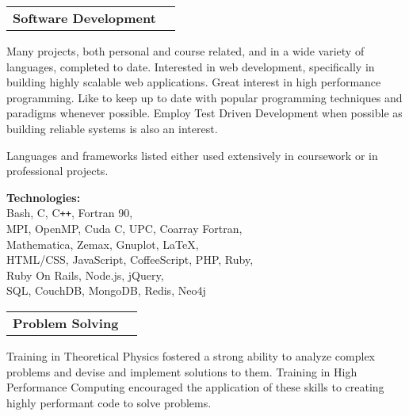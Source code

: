 \documentclass[11pt]{article}
\makeatletter
\newenvironment{resumeSubSectionHeader}{
    \par
    \begin{tabular*}{\textwidth}{l@{\extracolsep{\fill}}r}
    \par
} {
    \end{tabular*}
    \par
}
\newenvironment{resumeSubSectionBody}{
    \par
    \vspace{-0.8\parskip}
    \begin{small}
    \par
} {
    \par
    \end{small}
    \par
}
\makeatother
\begin{document}
%
%
\begin{resumeSubSectionHeader}

    \textbf{Software Development}

\end{resumeSubSectionHeader}
\begin{resumeSubSectionBody}

    Many projects, both personal and course related, and in a wide variety
    of languages, completed to date.
    Interested in web development, specifically in building highly
    scalable web applications.
    Great interest in high performance programming.
    Like to keep up to date with popular programming techniques and paradigms
    whenever possible.
    Employ Test Driven Development when possible as building reliable systems
    is also an interest.

    Languages and frameworks listed either used extensively in coursework
    or in professional projects.

    \begin{description}
        \item{\bf Technologies:} \\
            Bash, C, C\verb!++!, Fortran 90, \\
            MPI, OpenMP, Cuda C, UPC, Coarray Fortran, \\
            Mathematica, Zemax, Gnuplot, LaTeX, \\
            HTML/CSS, JavaScript, CoffeeScript, PHP, Ruby, \\
            Ruby On Rails, Node.js, jQuery, \\
            SQL, CouchDB, MongoDB, Redis, Neo4j
    \end{description}

\end{resumeSubSectionBody}


%
%
\begin{resumeSubSectionHeader}

    \textbf{Problem Solving}

\end{resumeSubSectionHeader}
\begin{resumeSubSectionBody}

    Training in Theoretical Physics fostered a strong ability to
    analyze complex problems and devise and implement solutions to them.
    Training in High Performance Computing encouraged the application
    of these skills to creating highly performant code to solve
    problems.

\end{resumeSubSectionBody}
\end{document}
